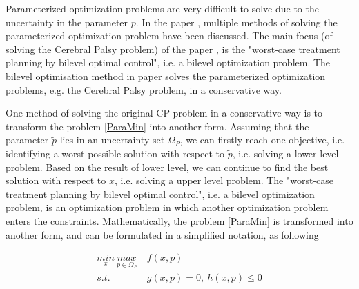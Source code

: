 \documentclass  [
  paper    = a4,
  BCOR     = 10mm,
  twoside,
  fontsize = 12pt,
  fleqn,
  toc      = bibnumbered,
  toc      = listofnumbered,
  numbers  = noendperiod,
  headings = normal,
  listof   = leveldown,
  version  = 3.03
]                                       {scrreprt}
\newcommand{\<}{\langle}
\renewcommand{\>}{\rangle}
\begin{document}
   Parameterized optimization problems are very difficult to solve due to the uncertainty in the parameter $p$. In the paper \cite{MatSch22}, multiple methods of solving the parameterized optimization problem have been discussed. The main focus (of solving the Cerebral Palsy problem) of the paper \cite{MatSch22}, is the "worst-case treatment planning by bilevel optimal control", i.e. a bilevel optimization problem. The bilevel optimisation method in paper \cite{MatSch22} solves the parameterized optimization problems, e.g. the Cerebral Palsy problem, in a conservative way.
   
   
   One method of solving the original CP problem in a conservative way is to transform the problem \ref{ParaMin} into another form. Assuming that the parameter $\tilde{p}$ lies in an uncertainty set $\Omega_P$, we can firstly reach one objective, i.e. identifying a worst possible solution with respect to $\tilde{p}$, i.e. solving a lower level problem. Based on the result of lower level, we can continue to find the best solution with respect to $x$, i.e. solving a upper level problem. The "worst-case treatment planning by bilevel optimal control", i.e. a  bilevel optimization problem, is an optimization problem in which another optimization problem enters the constraints. Mathematically, the problem \ref{ParaMin} is transformed into another form, and can be formulated in a simplified notation, as following
   
   
   
   
   \begin{equation}
   \begin{aligned}
   \underset{x}{min} \   \underset{p \in \Omega_P}{max} & \  f(x,p) \\ 
   s.t.  & \  g(x, p) = 0, \  h(x,p)  \leq  0 \\
   \end{aligned}
   \label{minmax}
   \end{equation}
   
\end{document}
